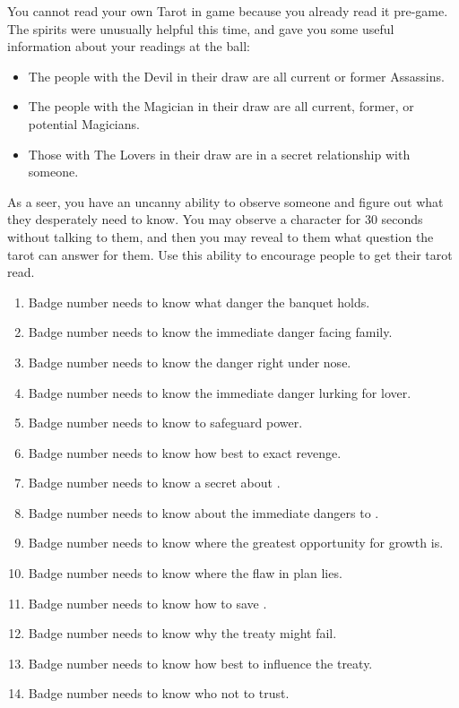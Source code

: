 \documentclass[green]{NeptuneBall}
\begin{document}
You cannot read your own Tarot in game because you already read it pre-game. The spirits were unusually helpful this time, and gave you some useful information about your readings at the ball:

\begin{itemize}
\item The people with the Devil in their draw are all current or former Assassins.
\item The people with the Magician in their draw are all current, former, or potential Magicians.
\item Those with The Lovers in their draw are in a secret relationship with someone.
\end{itemize}

\newpage
As a seer, you have an uncanny ability to observe someone and figure out what they desperately need to know.  You may observe a character for 30 seconds without talking to them, and then you may reveal to them what question the tarot can answer for them. Use this ability to encourage people to get their tarot read.

\begin{enumerate}
	\item Badge number \cPlant{\MYnumber} needs to know what danger the banquet holds.
	\item Badge number \cKing{\MYnumber} needs to know the immediate danger facing \cKing{\their} family.
	\item Badge number \cQueen{\MYnumber} needs to know the danger right under \cQueen{\their} nose.
	\item Badge number \cGeneral{\MYnumber} needs to know the immediate danger lurking for \cGeneral{\their} lover.
	\item Badge number \cWitch{\MYnumber} needs to know to safeguard \cWitch{\their} power.
	\item Badge number \cPriest{\MYnumber} needs to know how best to exact revenge.
	\item Badge number \cPrincess{\MYnumber} needs to know a secret about \cPrincess{\their} \cAthena{\parent}.
	\item Badge number \cAriel{\MYnumber} needs to know about the immediate dangers to \pAtlantis{}.
	\item Badge number \cWillow{\MYnumber} needs to know where the greatest opportunity for growth is.
	\item Badge number \cManta{\MYnumber} needs to know where the flaw in \cManta{\their} plan lies.
	\item Badge number \cBodyguard{\MYnumber} needs to know how to save \pPacifica{}.
	\item Badge number \cPrince{\MYnumber} needs to know why the treaty might fail.
	\item Badge number \cSpy{\MYnumber} needs to know how best to influence the treaty.
	\item Badge number \cDiplomat{\MYnumber} needs to know who not to trust.
\end{enumerate}
\end{document}
